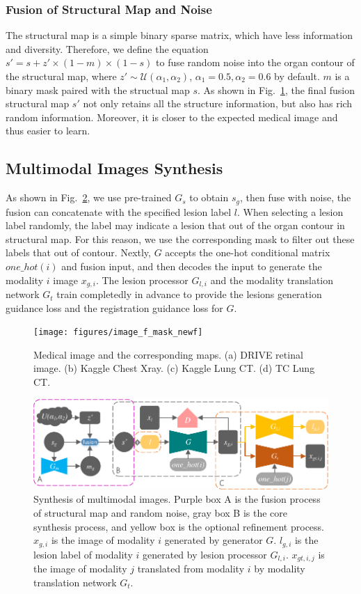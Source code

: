 \documentclass[runningheads]{llncs}
\begin{document}
	\subsubsection{Fusion of Structural Map and Noise}	
	The structural map is a simple binary sparse matrix, which have less information and diversity. Therefore, we define the equation $s'=s+z'\times(1-m)\times(1-s)$ to fuse random noise into the organ contour of the structural map, where $z'\sim\mathcal{U}(\alpha_1,\alpha_2)$, $\alpha_1 =0.5,\alpha_2=0.6$ by default. $m$ is a binary mask paired with the structual map $s$. As shown in Fig.~\ref{image_and_f}, the final fusion structural map $s'$ not only retains all the structure information, but also has rich random information. Moreover, it is closer to the expected medical image and thus easier to learn. 	
	\subsection{Multimodal Images Synthesis}
	As shown in Fig.~\ref{mm_mri_generate}, we use pre-trained $G_s$ to obtain $s_g$, then fuse with noise, the fusion can concatenate with the specified lesion label $l$. When selecting a lesion label randomly, the label may indicate a lesion that out of the organ contour in structural map. For this reason, we use the corresponding mask to filter out these labels that out of contour. Nextly, $G$ accepts the one-hot conditional matrix $one\_hot(i)$ and fusion input, and then decodes the input to generate the modality $i$ image $x_{g,i}$. The lesion processor $G_{l,i}$ and the modality translation network $G_t$ train completedly in advance to provide the lesions generation guidance loss and the registration guidance loss for $G$.
	\begin{figure}[th]
		\centering
		\texttt{[image: figures/image\_f\_mask\_newf]}
		\caption{Medical image and the corresponding maps. (a) DRIVE retinal image. (b) Kaggle Chest Xray. (c) Kaggle Lung CT. (d) TC Lung CT.}
		\label{image_and_f}
	\end{figure}
	\begin{figure}[th]
		\centering
		\includegraphics[width=1\columnwidth]{figures/mm_mri_generate_train}
		\caption{Synthesis of multimodal images. Purple box A is the fusion process of structural map and random noise, gray box B is the core synthesis process, and yellow box is the optional refinement process. 
			$x_{g,i}$ is the image of modality $i$ generated by generator $G$. 
			$l_{g,i}$ is the lesion label of modality $i$ generated by lesion processor $G_{l,i}$.
			$x_{gt,i,j}$ is the image of modality $j$ translated from modality $i$ by modality translation network $G_t$.
		}
		\label{mm_mri_generate}
	\end{figure}
\end{document}
